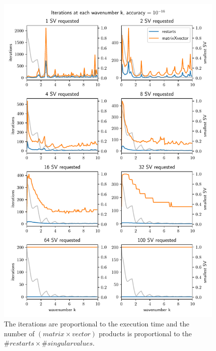 \documentclass[a4paper, oneside]{discothesis}
\begin{document}
\begin{figure} [H]
	\centering
	\includegraphics[width=\columnwidth]{figures/arnoldi_iter_1e-16.pdf}
	\caption{
		The iterations are proportional to the execution time and the number of $(matrix\times vector)$ products is proportional to the $\#restarts \times \#singularvalues$.
	}
	\label{fig:arnoldi_iter_1e-16}
\end{figure}
\end{document}
